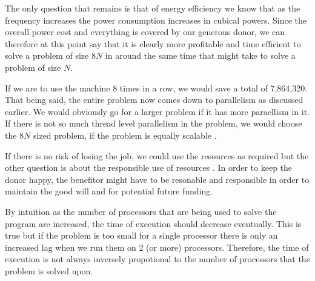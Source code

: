 \documentclass[fleqn,letterpaper,12pt]{report}
\begin{document}
The only question that remains is that of energy efficiency we know that as the frequency increases the power consumption increases in cubical powers. Since the overall power cost and everything is covered by our generous donor, we can therefore at this point say that it is clearly more profitable and time efficient to solve a problem of size $8N$ in around the same time that might take to solve a problem of size $N$. 
%
\begin{table}[h!]
\centering
\caption{Comparison in terms of CPU hours for all the four runs}
\label{my-label}
\end{table}
%
If we are to use the machine 8 times in a row, we would save a total of 7,864,320. That being said, the entire problem now comes down to parallelism as discussed earlier. We would obviously go for a larger problem if it has more paraellism in it. If there is not so much thread level parallelism in the problem, we would choose the $8N$ sized problem, if the problem is equally scalable \cite{PK}. 

If there is no risk of losing the job, we could use the resources as required but the other question is about the responsible use of resources \cite{cdresources}. In order to keep the donor happy, the benefitor might have to be resonable and responsible in order to maintain the good will and for potential future funding.

\newpage
{}
{}
\problem
By intuition as the number of processors that are being used to solve the program are increased, the time of execution should decrease eventually. This is true but if the problem is too small for a single processor there is only an increased lag when we run them on 2 (or more) processors. Therefore, the time of execution is not always inversely propotional to the number of processors that the problem is solved upon.
\end{document}
